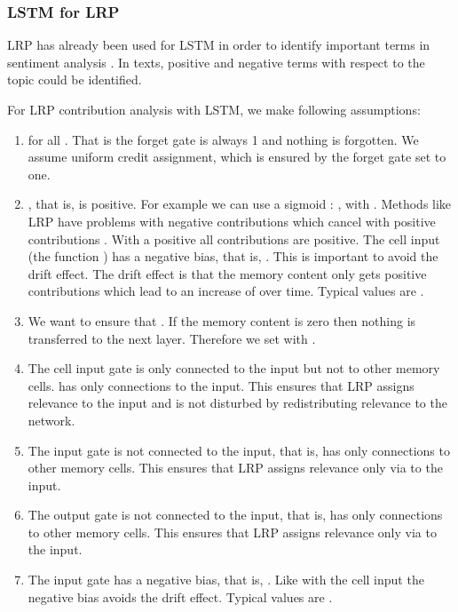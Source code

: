 \documentclass{article}
\begin{document}
\begin{appendices}
\subsubsection{LSTM for LRP}

LRP has already been used for LSTM in order to
identify important terms in sentiment analysis \cite{Arras:17}.
In texts, positive and negative terms with respect to the topic
could be identified.

For LRP contribution analysis with LSTM, we make following assumptions:
\begin{enumerate}[label=\textbf{(A\arabic*)}]
\item  for all . That is the forget gate is always 1 and
  nothing is forgotten. We assume uniform credit assignment, which
  is ensured by the forget gate set to one.

\item , that is,  is positive. For example we can use a sigmoid
  : , with
  .
  Methods like LRP have problems with negative contributions
  which cancel with positive contributions \cite{Montavon:17}.
  With a positive  all
  contributions are positive.
  The cell input  (the function ) has a negative bias, that is,
  . This is important to avoid the drift effect.
  The drift effect is that the memory content only gets positive
  contributions which lead to an increase of  over time.
  Typical values are .

\item We want to ensure that . If the memory content is zero
  then nothing is transferred to the next layer.
  Therefore we set  with .

\item The cell input gate  is only connected to the input but not
  to other memory cells.   has only connections to the
  input. This ensures
  that LRP assigns relevance  to the input and  is not
  disturbed by redistributing relevance to the network.

\item The input gate  is not connected to the input, that is,
   has only connections to other memory cells. This ensures
  that LRP assigns relevance only via  to the input.

\item The output gate  is not connected to the input, that is,
   has only connections to other memory cells. This ensures
  that LRP assigns relevance only via  to the input.

\item The input gate  has a negative bias, that is,
  . Like with the cell input the negative bias
  avoids the drift effect.
  Typical values are .


\end{enumerate}
\end{appendices}
\end{document}
